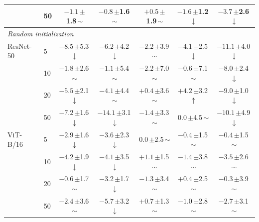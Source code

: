 \begin{table}[htbp]
\begin{tabular}{llccccc}
 & 50 & $-1.1$\,{\scriptsize$\pm$1.8}\,$\sim$ & $-0.8$\,{\scriptsize$\pm$1.6}\,$\sim$ & $+0.5$\,{\scriptsize$\pm$1.9}\,$\sim$ & $-1.6$\,{\scriptsize$\pm$1.2}\,$\downarrow$ & $-3.7$\,{\scriptsize$\pm$2.6}\,$\downarrow$ \\
\midrule
\multicolumn{7}{l}{\textit{Random initialization}} \\
ResNet-50 & 5 & $-8.5$\,{\scriptsize$\pm$5.3}\,$\downarrow$ & $-6.2$\,{\scriptsize$\pm$4.2}\,$\downarrow$ & $-2.2$\,{\scriptsize$\pm$3.9}\,$\sim$ & $-4.1$\,{\scriptsize$\pm$2.5}\,$\downarrow$ & $-11.1$\,{\scriptsize$\pm$4.0}\,$\downarrow$ \\
 & 10 & $-1.8$\,{\scriptsize$\pm$2.6}\,$\sim$ & $-1.1$\,{\scriptsize$\pm$5.4}\,$\sim$ & $-2.2$\,{\scriptsize$\pm$7.0}\,$\sim$ & $-0.6$\,{\scriptsize$\pm$7.1}\,$\sim$ & $-8.0$\,{\scriptsize$\pm$2.4}\,$\downarrow$ \\
 & 20 & $-5.5$\,{\scriptsize$\pm$2.1}\,$\downarrow$ & $-4.1$\,{\scriptsize$\pm$4.4}\,$\sim$ & $+0.4$\,{\scriptsize$\pm$3.6}\,$\sim$ & $+4.2$\,{\scriptsize$\pm$3.2}\,$\uparrow$ & $-9.0$\,{\scriptsize$\pm$1.0}\,$\downarrow$ \\
 & 50 & $-7.2$\,{\scriptsize$\pm$1.6}\,$\downarrow$ & $-14.1$\,{\scriptsize$\pm$3.1}\,$\downarrow$ & $-1.4$\,{\scriptsize$\pm$3.3}\,$\sim$ & $0.0$\,{\scriptsize$\pm$4.5}\,$\sim$ & $-10.1$\,{\scriptsize$\pm$4.9}\,$\downarrow$ \\
\addlinespace[2pt]
ViT-B/16 & 5 & $-2.9$\,{\scriptsize$\pm$1.6}\,$\downarrow$ & $-3.6$\,{\scriptsize$\pm$2.3}\,$\downarrow$ & $0.0$\,{\scriptsize$\pm$2.5}\,$\sim$ & $-0.4$\,{\scriptsize$\pm$1.5}\,$\sim$ & $-0.4$\,{\scriptsize$\pm$1.5}\,$\sim$ \\
 & 10 & $-4.2$\,{\scriptsize$\pm$1.9}\,$\downarrow$ & $-4.1$\,{\scriptsize$\pm$3.5}\,$\downarrow$ & $+1.1$\,{\scriptsize$\pm$1.5}\,$\sim$ & $-1.4$\,{\scriptsize$\pm$3.8}\,$\sim$ & $-3.5$\,{\scriptsize$\pm$2.6}\,$\sim$ \\
 & 20 & $-0.6$\,{\scriptsize$\pm$1.7}\,$\sim$ & $-3.2$\,{\scriptsize$\pm$1.7}\,$\downarrow$ & $-1.3$\,{\scriptsize$\pm$3.4}\,$\sim$ & $+0.4$\,{\scriptsize$\pm$2.5}\,$\sim$ & $-0.3$\,{\scriptsize$\pm$3.9}\,$\sim$ \\
 & 50 & $-2.4$\,{\scriptsize$\pm$3.6}\,$\sim$ & $-5.7$\,{\scriptsize$\pm$3.2}\,$\downarrow$ & $+0.7$\,{\scriptsize$\pm$1.3}\,$\sim$ & $-1.0$\,{\scriptsize$\pm$2.8}\,$\sim$ & $-2.7$\,{\scriptsize$\pm$3.1}\,$\sim$ \\
\bottomrule
\end{tabular}
\end{table}
